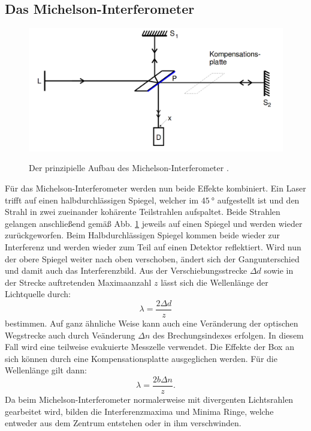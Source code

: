   \subsection{Das Michelson-Interferometer}


  \begin{figure}
  	\centering
  	\caption{Der prinzipielle Aufbau des Michelson-Interferometer \cite{V401}.}
  	\includegraphics[width=\linewidth-150pt,height=\textheight-150pt,keepaspectratio]{content/theoriebau.png}
  	\label{fig:aufbauth}
  \end{figure}
  Für das Michelson-Interferometer werden nun beide Effekte kombiniert. Ein Laser trifft
  auf einen halbdurchlässigen Spiegel, welcher im $\SI{45}{\degree}$ aufgestellt ist und
  den Strahl in zwei zueinander kohärente Teilstrahlen aufspaltet. Beide Strahlen gelangen anschließend
  gemäß Abb. \ref{fig:aufbauth} jeweils auf einen Spiegel und werden wieder zurückgeworfen. Beim
  Halbdurchlässigen Spiegel kommen beide wieder zur Interferenz und werden wieder zum Teil auf
  einen Detektor reflektiert. Wird nun der obere Spiegel weiter nach oben verschoben,
  ändert sich der Gangunterschied und damit auch das Interferenzbild. Aus der Verschiebungsstrecke
  $\Delta d$ sowie in der Strecke auftretenden Maximaanzahl $z$ lässt sich die Wellenlänge der Lichtquelle durch:
  \begin{equation}
    \lambda = \frac{2 \Delta d}{z}
    \end{equation}
    bestimmen. Auf ganz ähnliche Weise kann auch eine Veränderung der optischen Wegstrecke
     auch durch Veänderung $\Delta n$ des Brechungsindexes erfolgen. In diesem Fall wird eine teilweise evakuierte Messzelle verwendet.
     Die Effekte der Box an sich können durch eine Kompensationsplatte ausgeglichen werden. Für die Wellenlänge gilt dann:
     \begin{equation}
       \lambda = \frac{2 b \Delta n }{z}\text{.}
       \end{equation}
Da beim Michelson-Interferometer normalerweise mit divergenten Lichtsrahlen gearbeitet wird,
bilden die Interferenzmaxima und Minima Ringe, welche entweder aus dem Zentrum entstehen oder in ihm verschwinden.
